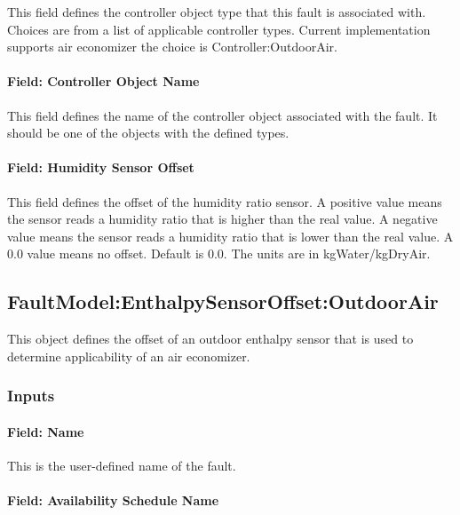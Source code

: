 This field defines the controller object type that this fault is associated with. Choices are from a list of applicable controller types. Current implementation supports air economizer the choice is Controller:OutdoorAir.

\paragraph{Field: Controller Object Name}\label{field-controller-object-name-1}

This field defines the name of the controller object associated with the fault. It should be one of the objects with the defined types.

\paragraph{Field: Humidity Sensor Offset}\label{field-humidity-sensor-offset}

This field defines the offset of the humidity ratio sensor. A positive value means the sensor reads a humidity ratio that is higher than the real value. A negative value means the sensor reads a humidity ratio that is lower than the real value. A 0.0 value means no offset. Default is 0.0. The units are in kgWater/kgDryAir.

\subsection{FaultModel:EnthalpySensorOffset:OutdoorAir}\label{faultmodelenthalpysensoroffsetoutdoorair}

This object defines the offset of an outdoor enthalpy sensor that is used to determine applicability of an air economizer.

\subsubsection{Inputs}\label{inputs-2-024}

\paragraph{Field: Name}\label{field-name-2-023}

This is the user-defined name of the fault.

\paragraph{Field: Availability Schedule Name}\label{field-availability-schedule-name-2-005}

